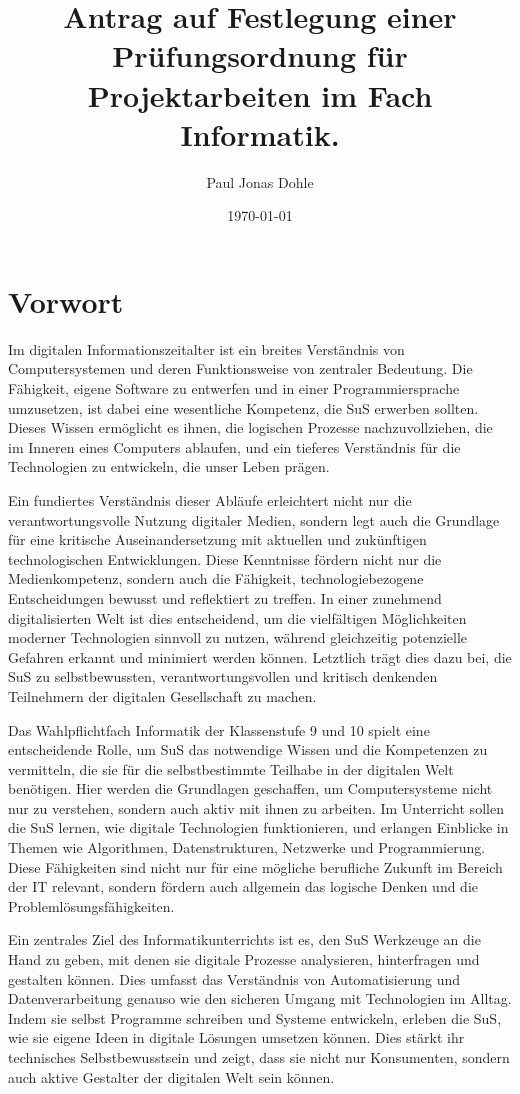 \documentclass[a4paper,12pt]{article}
\title{Antrag auf Festlegung einer Prüfungsordnung für Projektarbeiten im Fach Informatik.}
\author{Paul Jonas Dohle}
\date{\today}
\begin{document}
\maketitle
\thispagestyle{empty} %
\newpage

\tableofcontents


\section{Vorwort}
Im digitalen Informationszeitalter ist ein breites Verständnis von Computersystemen und deren Funktionsweise von zentraler Bedeutung. Die Fähigkeit, eigene Software zu entwerfen und in einer Programmiersprache umzusetzen, ist dabei eine wesentliche Kompetenz, die SuS erwerben sollten. Dieses Wissen ermöglicht es ihnen, die logischen Prozesse nachzuvollziehen, die im Inneren eines Computers ablaufen, und ein tieferes Verständnis für die Technologien zu entwickeln, die unser Leben prägen.

Ein fundiertes Verständnis dieser Abläufe erleichtert nicht nur die verantwortungsvolle Nutzung digitaler Medien, sondern legt auch die Grundlage für eine kritische Auseinandersetzung mit aktuellen und zukünftigen technologischen Entwicklungen. Diese Kenntnisse fördern nicht nur die Medienkompetenz, sondern auch die Fähigkeit, technologiebezogene Entscheidungen bewusst und reflektiert zu treffen. In einer zunehmend digitalisierten Welt ist dies entscheidend, um die vielfältigen Möglichkeiten moderner Technologien sinnvoll zu nutzen, während gleichzeitig potenzielle Gefahren erkannt und minimiert werden können. Letztlich trägt dies dazu bei, die SuS zu selbstbewussten, verantwortungsvollen und kritisch denkenden Teilnehmern der digitalen Gesellschaft zu machen.

Das Wahlpflichtfach Informatik der Klassenstufe 9 und 10 spielt eine entscheidende Rolle, um SuS das notwendige Wissen und die Kompetenzen zu vermitteln, die sie für die selbstbestimmte Teilhabe in der digitalen Welt benötigen. Hier werden die Grundlagen geschaffen, um Computersysteme nicht nur zu verstehen, sondern auch aktiv mit ihnen zu arbeiten. Im Unterricht sollen die SuS lernen, wie digitale Technologien funktionieren, und erlangen Einblicke in Themen wie Algorithmen, Datenstrukturen, Netzwerke und Programmierung. Diese Fähigkeiten sind nicht nur für eine mögliche berufliche Zukunft im Bereich der IT relevant, sondern fördern auch allgemein das logische Denken und die Problemlösungsfähigkeiten.

Ein zentrales Ziel des Informatikunterrichts ist es, den SuS Werkzeuge an die Hand zu geben, mit denen sie digitale Prozesse analysieren, hinterfragen und gestalten können. Dies umfasst das Verständnis von Automatisierung und Datenverarbeitung genauso wie den sicheren Umgang mit Technologien im Alltag. Indem sie selbst Programme schreiben und Systeme entwickeln, erleben die SuS, wie sie eigene Ideen in digitale Lösungen umsetzen können. Dies stärkt ihr technisches Selbstbewusstsein und zeigt, dass sie nicht nur Konsumenten, sondern auch aktive Gestalter der digitalen Welt sein können.
\end{document}
